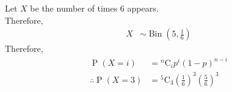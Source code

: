 \documentclass[titlepage, fleqn, a4paper, 12pt, twoside]{article}
\theoremstyle{definition}
\theoremstyle{theorem}
\DeclareMathOperator{\prob}{\mathrm{P}}
\DeclareMathOperator{\bin}{\mathrm{Bin}}
\newcommand*{\comb}[2]{{}^{#1}\mathrm{C}_{#2}}%
\begin{document}
\begin{solution}
	Let $X$ be the number of times $6$ appears.\\
	Therefore,
	\begin{align*}
		X &\sim \bin\left( 5,\frac{1}{6} \right)
	\end{align*}
	Therefore,
	\begin{align*}
		\prob(X = i)            & = \comb{n}{i} p^i (1 - p)^{n - i} \\
		\therefore \prob(X = 3) & = \comb{5}{3} \left( \frac{1}{6} \right)^3 \left( \frac{5}{6} \right)^3
	\end{align*}
\end{solution}
\end{document}
